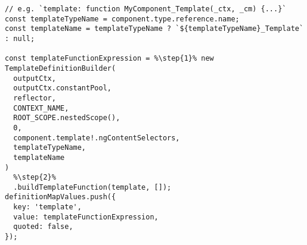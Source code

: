 \begin{verbatim}
// e.g. `template: function MyComponent_Template(_ctx, _cm) {...}`
const templateTypeName = component.type.reference.name;
const templateName = templateTypeName ? `${templateTypeName}_Template` : null;

const templateFunctionExpression = %\step{1}% new TemplateDefinitionBuilder(
  outputCtx,
  outputCtx.constantPool,
  reflector,
  CONTEXT_NAME,
  ROOT_SCOPE.nestedScope(),
  0,
  component.template!.ngContentSelectors,
  templateTypeName,
  templateName
)
  %\step{2}%
  .buildTemplateFunction(template, []);
definitionMapValues.push({
  key: 'template',
  value: templateFunctionExpression,
  quoted: false,
});
\end{verbatim}
